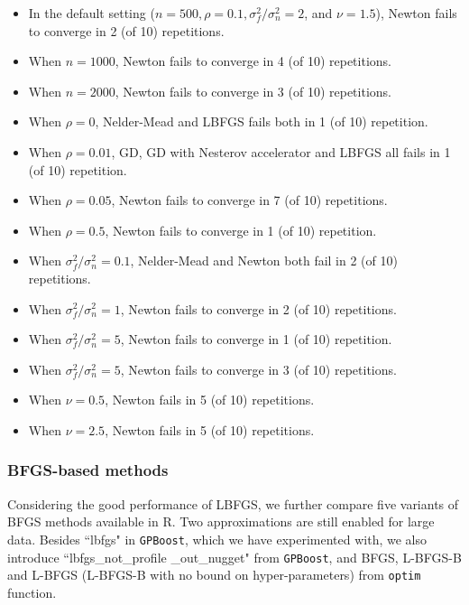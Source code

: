 \begin{itemize}
\item In the default setting ($n=500, \rho=0.1, \sigma^2_f/\sigma^2_n = 2$, and $\nu=1.5$), Newton fails to converge in 2 (of 10) repetitions.
\item When $n=1000$, Newton fails to converge in 4 (of 10) repetitions.
\item When $n=2000$, Newton fails to converge in 3 (of 10) repetitions.
\item When $\rho=0$, Nelder-Mead and LBFGS fails both in 1 (of 10) repetition.
\item When $\rho=0.01$, GD, GD with Nesterov accelerator and LBFGS all fails in 1 (of 10) repetition.
\item When $\rho=0.05$, Newton fails to converge in 7 (of 10) repetitions.
\item When $\rho=0.5$, Newton fails to converge in 1 (of 10) repetition.
\item When $\sigma^2_f/\sigma^2_n = 0.1$, Nelder-Mead and Newton both fail in 2 (of 10) repetitions.
\item When $\sigma^2_f/\sigma^2_n = 1$, Newton fails to converge in 2 (of 10) repetitions.
\item When $\sigma^2_f/\sigma^2_n = 5$, Newton fails to converge in 1 (of 10) repetition.
\item When $\sigma^2_f/\sigma^2_n = 5$, Newton fails to converge in 3 (of 10) repetitions.
\item When $\nu=0.5$, Newton fails in 5 (of 10) repetitions.
\item When $\nu=2.5$, Newton fails in 5 (of 10) repetitions.
\end{itemize}

\subsubsection{BFGS-based methods}

Considering the good performance of LBFGS, we further compare five variants of BFGS methods available in R. Two approximations are still enabled for large data. Besides ``lbfgs" in \texttt{GPBoost}, which we have experimented with, we also introduce ``lbfgs\_not\_profile \_out\_nugget" from \texttt{GPBoost}, and BFGS, L-BFGS-B and L-BFGS (L-BFGS-B with no bound on hyper-parameters) from \texttt{optim} function. 

